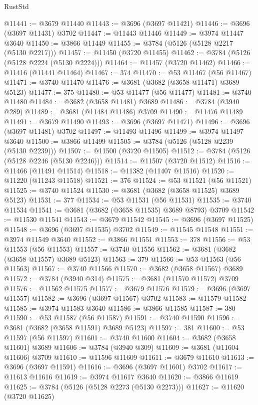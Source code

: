 \begin{lexlean}{RustStd}
\begin{coremodule}
@11441 := @3679 @11440
@11443 := @3696 (@3697 @11421)
@11446 := @3696 (@3697 @11431) @3702
@11447 := @11443 @11446
@11449 := @3974 @11447 @3640
@11450 := @3866 @11449
@11455 := @3784 (@5126 (@5128 @2217 (@5130 @2217)))
@11457 := @11450 (@3720 @11455)
@11462 := @3784 (@5126 (@5128 @2224 (@5130 @2224)))
@11464 := @11457 (@3720 @11462)
@11466 := @11416 (@11441 @11464)
@11467 := 374
@11470 := @53 @11467 (@56 @11467)
@11471 := @3740 @11470
@11476 := @3681 (@3682 (@3658 @11471) @3689 @5123)
@11477 := 375
@11480 := @53 @11477 (@56 @11477)
@11481 := @3740 @11480
@11484 := @3682 (@3658 @11481) @3689
@11486 := @3784 (@3940 @289)
@11489 := @3681 (@11484 @11486) @3709
@11490 := @11476 @11489
@11491 := @3679 @11490
@11493 := @3696 (@3697 @11471)
@11496 := @3696 (@3697 @11481) @3702
@11497 := @11493 @11496
@11499 := @3974 @11497 @3640
@11500 := @3866 @11499
@11505 := @3784 (@5126 (@5128 @2239 (@5130 @2239)))
@11507 := @11500 (@3720 @11505)
@11512 := @3784 (@5126 (@5128 @2246 (@5130 @2246)))
@11514 := @11507 (@3720 @11512)
@11516 := @11466 (@11491 @11514)
@11518 := @11382 (@11407 @11516)
@11520 := @11220 (@11243 @11518)
@11521 := 376
@11524 := @53 @11521 (@56 @11521)
@11525 := @3740 @11524
@11530 := @3681 (@3682 (@3658 @11525) @3689 @5123)
@11531 := 377
@11534 := @53 @11531 (@56 @11531)
@11535 := @3740 @11534
@11541 := @3681 (@3682 (@3658 @11535) @3689 @8793) @3709
@11542 := @11530 @11541
@11543 := @3679 @11542
@11545 := @3696 (@3697 @11525)
@11548 := @3696 (@3697 @11535) @3702
@11549 := @11545 @11548
@11551 := @3974 @11549 @3640
@11552 := @3866 @11551
@11553 := 378
@11556 := @53 @11553 (@56 @11553)
@11557 := @3740 @11556
@11562 := @3681 (@3682 (@3658 @11557) @3689 @5123)
@11563 := 379
@11566 := @53 @11563 (@56 @11563)
@11567 := @3740 @11566
@11570 := @3682 (@3658 @11567) @3689
@11572 := @3784 (@3940 @314)
@11575 := @3681 (@11570 @11572) @3709
@11576 := @11562 @11575
@11577 := @3679 @11576
@11579 := @3696 (@3697 @11557)
@11582 := @3696 (@3697 @11567) @3702
@11583 := @11579 @11582
@11585 := @3974 @11583 @3640
@11586 := @3866 @11585
@11587 := 380
@11590 := @53 @11587 (@56 @11587)
@11591 := @3740 @11590
@11596 := @3681 (@3682 (@3658 @11591) @3689 @5123)
@11597 := 381
@11600 := @53 @11597 (@56 @11597)
@11601 := @3740 @11600
@11604 := @3682 (@3658 @11601) @3689
@11606 := @3784 (@3940 @309)
@11609 := @3681 (@11604 @11606) @3709
@11610 := @11596 @11609
@11611 := @3679 @11610
@11613 := @3696 (@3697 @11591)
@11616 := @3696 (@3697 @11601) @3702
@11617 := @11613 @11616
@11619 := @3974 @11617 @3640
@11620 := @3866 @11619
@11625 := @3784 (@5126 (@5128 @2273 (@5130 @2273)))
@11627 := @11620 (@3720 @11625)

\end{coremodule}
\end{lexlean}

